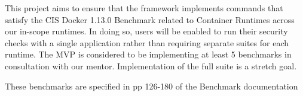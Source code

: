 This project aims to ensure that the framework implements commands that satisfy the CIS Docker 1.13.0 Benchmark related to Container Runtimes across our in-scope runtimes. In doing so, users will be enabled to run their security checks with a single application rather than requiring separate suites for each runtime. The MVP is considered to be implementing at least 5 benchmarks in consultation with our mentor. Implementation of the full suite is a stretch goal.

These benchmarks are specified in pp 126-180 of the Benchmark documentation